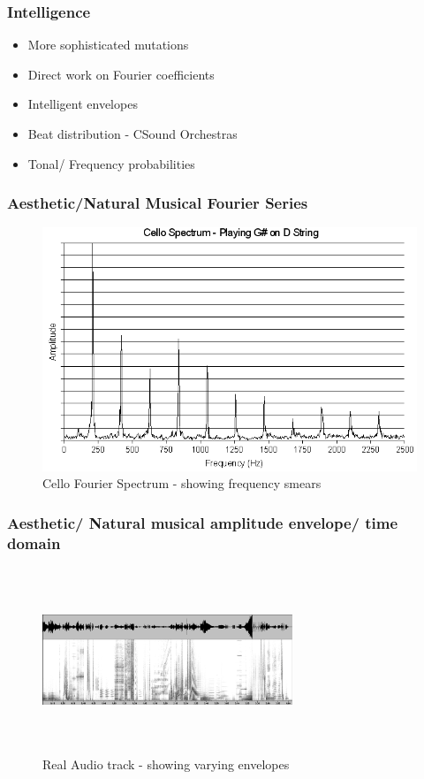 \documentclass{beamer}
\begin{document}
\begin{frame}
	\frametitle{Intelligence}
	\begin{itemize}
	\item<1-> More sophisticated mutations
	\item<2-> Direct work on Fourier coefficients
	\item<3-> Intelligent envelopes
	\item<4-> Beat distribution - CSound Orchestras
	\item<5-> Tonal/ Frequency probabilities
	  \end{itemize}

\end{frame}
	
\begin{frame}
	\frametitle{Aesthetic/Natural Musical Fourier Series}
		\begin{figure}[h]
		\centering
			\includegraphics[width=0.8\textheight]{images/cellospectrum.png}
		\caption{Cello Fourier Spectrum - showing frequency smears}
		\label{sg:fig:images_Genetic_Program_Tree}
	\end{figure}
	\end{frame}

\begin{frame}
	\frametitle{Aesthetic/ Natural musical amplitude envelope/ time domain }
		\begin{figure}[h]
		\centering
			\includegraphics[width=75mm, height= 55mm]{images/poemeSpec0.png}
		\caption{Real Audio track - showing varying envelopes}
		\label{sg:fig:images_Genetic_Program_Tree}
	\end{figure}
	\end{frame}
	

\end{document}
